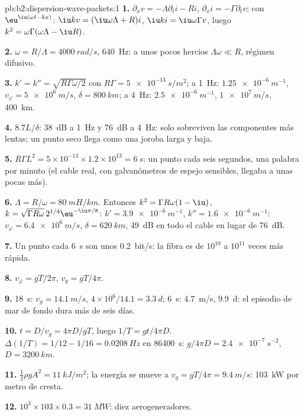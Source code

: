 \begin{solution}{pb:b2:dispersion-wave-packets:1}
\textbf{1.} $\partial_xv = -\Lambda\partial_ti - Ri$, $\partial_xi = -\Gamma\partial_tv$; con
$\eu^{\iu(\omega t - kx)}$: $\iu kv = (\iu\omega\Lambda + R)i$, $\iu ki = \iu\omega\Gamma v$, luego
$k^2 = \omega\Gamma(\omega\Lambda - \iu R)$.

\textbf{2.} $\omega = R/\Lambda = \qty{4000}{rad/s}$, \qty{640}{Hz}: a unos pocos hercios $\Lambda\omega
\ll R$, régimen difusivo.

\textbf{3.} $k' = k'' = \sqrt{R\Gamma\omega/2}$ con $R\Gamma = \qty{5e-13}{s/m^2}$; a \qty{1}{Hz}:
$\qty{1.25e-6}{m^{-1}}$, $v_\varphi = \qty{5e6}{m/s}$, $\delta = \qty{800}{km}$; a \qty{4}{Hz}:
$\qty{2.5e-6}{m^{-1}}$, $\qty{1e7}{m/s}$, \qty{400}{km}.

\textbf{4.} $8.7L/\delta$: \qty{38}{dB} a \qty{1}{Hz} y \qty{76}{dB} a \qty{4}{Hz}: solo
sobreviven las componentes más lentas; un punto seco llega como una joroba
larga y baja.

\textbf{5.} $R\Gamma L^2 = 5 \times 10^{-13} \times 1.2 \times 10^{13} = \qty{6}{s}$: un punto cada
seis segundos, una palabra por minuto (el cable real, con galvanómetros de
espejo sensibles, llegaba a unas pocas más).

\textbf{6.} $\Lambda = R/\omega = \qty{80}{mH/km}$. Entonces $k^2 = \Gamma R\omega(1 - \iu)$, $k = \sqrt{\Gamma R\omega}
\,2^{1/4}\eu^{-\iu\pi/8}$: $k' = \qty{3.9e-6}{m^{-1}}$, $k'' = \qty{1.6e-6}{m^{-1}}$: $v_\varphi =
\qty{6.4e6}{m/s}$, $\delta = \qty{620}{km}$, \qty{49}{dB} en todo el cable en lugar de
\qty{76}{dB}.

\textbf{7.} Un punto cada \qty{6}{s} son unos \qty{0.2}{bit/s}: la fibra es
de $10^{10}$ a $10^{11}$ veces más rápida.

\textbf{8.} $v_\varphi = gT/2\pi$, $v_g = gT/4\pi$.

\textbf{9.} \qty{18}{s}: $v_g = \qty{14.1}{m/s}$, $4 \times 10^6/14.1 = \qty{3.3}{d}$;
\qty{6}{s}: \qty{4.7}{m/s}, \qty{9.9}{d}: el episodio de mar de fondo dura más de seis días.

\textbf{10.} $t = D/v_g = 4\pi D/gT$, luego $1/T = gt/4\pi D$. $\Delta(1/T) = 1/12 - 1/16
= \qty{0.0208}{Hz}$ en \qty{86400}{s}: $g/4\pi D = \qty{2.4e-7}{s^{-2}}$, $D = \qty{3200}{km}$.

\textbf{11.} $\tfrac12\rho gA^2 = \qty{11}{kJ/m^2}$; la energía se mueve a $v_g = gT/4\pi =
\qty{9.4}{m/s}$: \qty{103}{kW} por metro de cresta.

\textbf{12.} $10^3 \times 103 \times 0.3 = \qty{31}{MW}$: diez aerogeneradores.


\end{solution}
